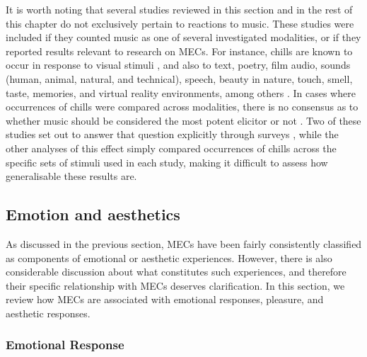 It is worth noting that several studies reviewed in this section and in the rest of this chapter do not exclusively pertain to reactions to music. These studies were included if they counted music as one of several investigated modalities, or if they reported results relevant to research on MECs. For instance, chills are known to occur in response to visual stimuli \parencite{bannister2019, goldstein1980, grewe2011, maruskin2012, panzarella1980, silvia2011, sumpf2015, wassiliwizky2017a}, and also to text, poetry, film audio, sounds (human, animal, natural, and technical), speech, beauty in nature, touch, smell, taste, memories, and virtual reality environments, among others \parencite{benedek2011, beriachvili2016, goldstein1980, grewe2011, konecni2007b, quesnel2018, schoeller2019a, schurtz2012, wassiliwizky2017b}. In cases where occurrences of chills were compared across modalities, there is no consensus as to whether music should be considered the most potent elicitor \parencite{goldstein1980, sumpf2015} or not \parencite{bannister2019, benedek2011, grewe2011, schurtz2012}. Two of these studies set out to answer that question explicitly through surveys \parencite{goldstein1980, schurtz2012}, while the other analyses of this effect simply compared occurrences of chills across the specific sets of stimuli used in each study, making it difficult to assess how generalisable these results are.

\subsection{Emotion and aesthetics}
\label{se:rev-results-2}

As discussed in the previous section, MECs have been fairly consistently classified as components of emotional or aesthetic experiences. However, there is also considerable discussion about what constitutes such experiences, and therefore their specific relationship with MECs deserves clarification. In this section, we review how MECs are associated with emotional responses, pleasure, and aesthetic responses.

\subsubsection{Emotional Response}

